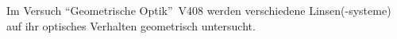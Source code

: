Im Versuch \textquotedblleft Geometrische Optik\textquotedblright \, V408 werden verschiedene Linsen(-systeme) auf ihr optisches Verhalten geometrisch untersucht.
